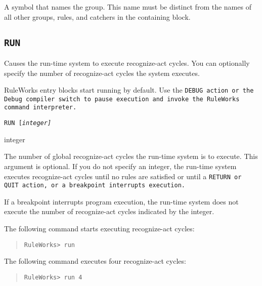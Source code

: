 {{\begin{arguments}
  A symbol that names the group. This name must be distinct from the
  names of all other groups, rules, and catchers in the containing
  block.
\end{arguments}

\subsection{\tt{RUN}}

Causes the run-time system to execute recognize-act cycles.  You can
optionally specify the number of recognize-act cycles the system
executes.

RuleWorks entry blocks start running by default. Use the \tt{DEBUG}
action or the Debug compiler switch to pause execution and invoke the
RuleWorks command interpreter.

\Format

\tt{RUN} [\it{integer}]

\begin{arguments}
\item[integer]

  The number of global recognize-act cycles the run-time system is to
  execute. This argument is optional. If you do not specify an
  integer, the run-time system executes recognize-act cycles until no
  rules are satisfied or until a \tt{RETURN} or \tt{QUIT} action, or a
  breakpoint interrupts execution.
\end{arguments}

\begin{note}
  If a breakpoint interrupts program execution, the run-time
  system does not execute the number of recognize-act cycles indicated
  by the integer.
\end{note}

\Example

The following command starts executing recognize-act cycles:

\begin{quote}
\begin{verbatim}
RuleWorks> run
\end{verbatim}
\end{quote}

The following command executes four recognize-act cycles:

\begin{quote}
\begin{verbatim}
RuleWorks> run 4
\end{verbatim}
\end{quote}

}}

